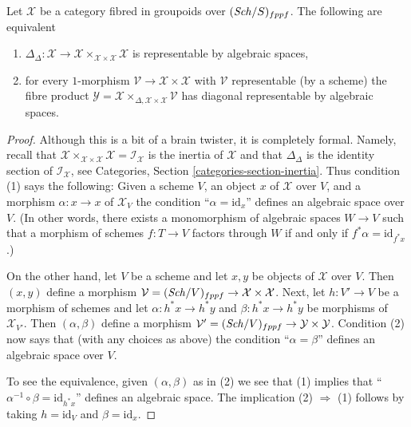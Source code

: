 \begin{lemma}
\label{lemma-second-diagonal}
Let $\mathcal{X}$ be a category fibred in groupoids over $(\mathit{Sch}/S)_{fppf}$.
The following are equivalent
\begin{enumerate}
\item $\Delta_\Delta : \mathcal{X} \to
\mathcal{X} \times_{\mathcal{X} \times \mathcal{X}} \mathcal{X}$
is representable by algebraic spaces,
\item for every $1$-morphism $\mathcal{V} \to \mathcal{X} \times \mathcal{X}$
with $\mathcal{V}$ representable (by a scheme) the fibre product
$\mathcal{Y} =
\mathcal{X} \times_{\Delta, \mathcal{X} \times \mathcal{X}} \mathcal{V}$
has diagonal representable by algebraic spaces.
\end{enumerate}
\end{lemma}

\begin{proof}
Although this is a bit of a brain twister, it is completely formal.
Namely, recall that
$\mathcal{X} \times_{\mathcal{X} \times \mathcal{X}} \mathcal{X} =
\mathcal{I}_\mathcal{X}$ is the inertia of $\mathcal{X}$ and that
$\Delta_\Delta$ is the identity section of $\mathcal{I}_\mathcal{X}$, see
Categories, Section \ref{categories-section-inertia}.
Thus condition (1) says the following: Given a scheme $V$, an object $x$ of
$\mathcal{X}$ over $V$, and a morphism $\alpha : x \to x$ of $\mathcal{X}_V$
the condition ``$\alpha = \text{id}_x$'' defines an algebraic space over $V$.
(In other words, there exists a monomorphism of algebraic spaces $W \to V$
such that a morphism of schemes $f : T \to V$ factors through $W$
if and only if $f^*\alpha = \text{id}_{f^*x}$.)

\medskip\noindent
On the other hand, let $V$ be a scheme and let $x, y$ be objects of
$\mathcal{X}$ over $V$. Then $(x, y)$ define a morphism
$\mathcal{V} = (\mathit{Sch}/V)_{fppf} \to \mathcal{X} \times \mathcal{X}$.
Next, let $h : V' \to V$ be a morphism of schemes and let
$\alpha : h^*x \to h^*y$ and $\beta : h^*x \to h^*y$ be morphisms
of $\mathcal{X}_{V'}$. Then $(\alpha, \beta)$ define a morphism
$\mathcal{V}' = (\mathit{Sch}/V)_{fppf} \to \mathcal{Y} \times \mathcal{Y}$.
Condition (2) now says that (with any choices as above) the
condition ``$\alpha = \beta$'' defines an algebraic space over $V$.

\medskip\noindent
To see the equivalence, given $(\alpha, \beta)$ as in (2) we see that
(1) implies that ``$\alpha^{-1} \circ \beta = \text{id}_{h^*x}$''
defines an algebraic space. The implication (2) $\Rightarrow$ (1)
follows by taking $h = \text{id}_V$ and $\beta = \text{id}_x$.
\end{proof}











